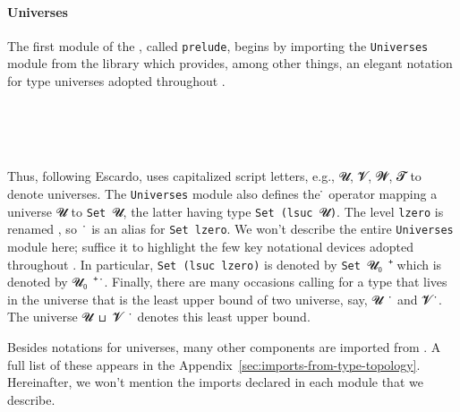 \documentclass[a4paper,UKenglish,cleveref, autoref, thm-restate]{lipics-v2019}
\begin{document}
\paragraph*{Universes}
The first module of the \agdaualib, called \texttt{prelude}, begins by importing the \texttt{Universes} module from the \typetopology library which provides, among other things, an elegant notation for type universes adopted throughout \agdaualib.
\begin{code}
\\[\AgdaEmptyExtraSkip]%
\>[0]\AgdaSpace{}%
\AgdaSpace{}%
\<%
\\
%
\\[\AgdaEmptyExtraSkip]%
\>[0]\AgdaSpace{}%
\AgdaSpace{}%
\AgdaSpace{}%
\<%
\end{code}
Thus, following Escardo, \agdaualib uses capitalized script letters, e.g., \ab 𝓤, \ab 𝓥, \ab 𝓦, \ab 𝓣 to denote universes. The \texttt{Universes} module also defines the ̇ operator mapping a universe \ab 𝓤 to \texttt{Set}\ \ab 𝓤, the latter having type \texttt{Set (lsuc}\ \ab 𝓤\texttt{)}.  The level \texttt{lzero} is renamed , so \ ̇ is an alias for \texttt{Set\ lzero}. We won't describe the entire \texttt{Universes} module here; suffice it to highlight the few key notational devices adopted throughout \agdaualib. In particular, \texttt{Set\ (lsuc\ lzero)} is denoted by \texttt{Set}\ \ab 𝓤₀\ ⁺ which is denoted by \ab 𝓤₀\ ⁺\ ̇.
Finally, there are many occasions calling for a type that lives in the universe that is the least upper bound of two universe, say, \ab 𝓤~ ̇ and \ab 𝓥\ ̇. The universe \ab 𝓤~⊔~\ab 𝓥~ ̇ denotes this least upper bound.

Besides notations for universes, many other components are imported from \typetopology.  A full list of these appears in the Appendix~\ref{sec:imports-from-type-topology}.  Hereinafter, we won't mention the imports declared in each \agdaualib module that we describe.
\end{document}
